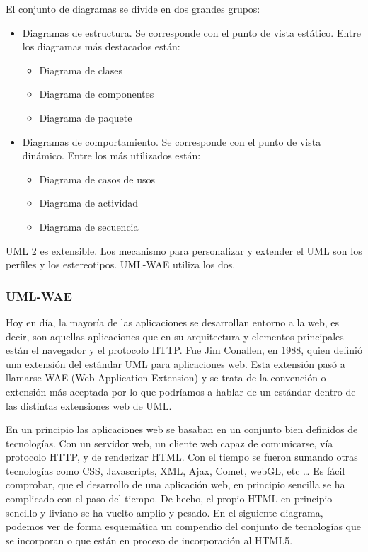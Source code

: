 El conjunto de diagramas se divide en dos grandes grupos:

\begin{itemize}
\item Diagramas de estructura. Se corresponde con el punto de vista estático. Entre los diagramas más destacados están:
\begin{itemize}
\item Diagrama de clases
\item Diagrama de componentes
\item Diagrama de paquete
\end{itemize}

\item Diagramas de comportamiento. Se corresponde con el punto de vista dinámico. Entre los más utilizados están:
\begin{itemize}
\item Diagrama de casos de usos
\item Diagrama de actividad
\item Diagrama de secuencia
\end{itemize}
\end{itemize}

UML 2 es extensible. Los mecanismo para personalizar y extender el UML son los perfiles y los estereotipos. UML-WAE utiliza los dos.

\subsubsection{UML-WAE}

Hoy en día, la mayoría de las aplicaciones se desarrollan entorno a la web, es decir, son aquellas aplicaciones que en su arquitectura y elementos principales están el navegador y el protocolo HTTP. Fue Jim Conallen, en 1988, quien definió una extensión del estándar UML para aplicaciones web. Esta extensión pasó a llamarse WAE (Web Application Extension) y se trata de la convención o extensión más aceptada por lo que podríamos a hablar de un estándar dentro de las distintas extensiones web de UML.

En un principio las aplicaciones web se basaban en un conjunto bien definidos de tecnologías. Con un servidor web, un cliente web capaz de comunicarse, vía protocolo HTTP, y de renderizar HTML. Con el tiempo se fueron sumando otras tecnologías como CSS, Javascripts, XML, Ajax, Comet, webGL, etc … Es fácil comprobar, que el desarrollo de una aplicación web, en principio sencilla se ha complicado con el paso del tiempo. De hecho, el propio HTML en principio sencillo y liviano se ha vuelto amplio y pesado. En el siguiente diagrama, podemos ver de forma esquemática un compendio del conjunto de tecnologías que se incorporan o que están en proceso de incorporación al HTML5.


